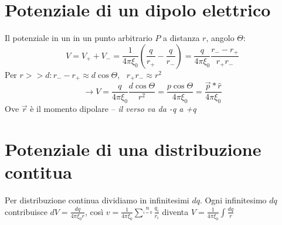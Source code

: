 \section{Potenziale di un dipolo elettrico}
Il potenziale in un in un punto arbitrario $P$ a distanza $r$, angolo $\Theta$:
\begin{equation}
  V=V_++V_- =\frac{1}{4\pi\xi_0}\left(\frac{q}{r_+} - \frac{q}{r_-}\right)=
  \frac{q}{4\pi\xi_0}\frac{r_--r_+}{r_+r_-}
\end{equation}
Per $r>>d:r_--r_+\approx d \cos\Theta,\text{ } r_+r_-\approx r^2$
\begin{equation*}
  \to V = \frac{q}{4\pi\xi_0}\frac{d\cos \Theta}{r^2}=\frac{p\cos\Theta}{4\pi\xi_0}=
  \frac{\overrightarrow{p}*\hat{r}}{4\pi\xi_0}
\end{equation*}
Ove $\overrightarrow{r}$ è il momento dipolare -- \textit{\color{blue}il verso va da -q a +q}
\section{Potenziale di una distribuzione contitua}
Per distribuzione continua dividiamo in infinitesimi $dq$. Ogni infinitesimo $dq$ contribuisce $dV=\frac{dq}{4\pi\xi_0r}$, così $v=\frac{1}{4\pi\xi_0}\sum^n\limits_{i=0}\frac{q_i}{r_i}$ diventa $V=\frac{1}{4\pi\xi_0}\int \frac{dq}{r}$